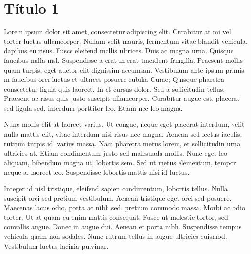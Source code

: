 \chapter{Título 1}
Lorem ipsum dolor sit amet, consectetur adipiscing elit. Curabitur at mi vel tortor luctus ullamcorper. Nullam velit mauris, fermentum vitae blandit vehicula, dapibus eu risus. Fusce eleifend mollis ultrices. Duis ac magna urna. Quisque faucibus nulla nisl. Suspendisse a erat in erat tincidunt fringilla. Praesent mollis quam turpis, eget auctor elit dignissim accumsan. Vestibulum ante ipsum primis in faucibus orci luctus et ultrices posuere cubilia Curae; Quisque pharetra consectetur ligula quis laoreet. In et cursus dolor. Sed a sollicitudin tellus. Praesent ac risus quis justo suscipit ullamcorper. Curabitur augue est, placerat sed ligula sed, interdum porttitor leo. Etiam nec leo magna.

Nunc mollis elit at laoreet varius. Ut congue, neque eget placerat interdum, velit nulla mattis elit, vitae interdum nisi risus nec magna. Aenean sed lectus iaculis, rutrum turpis id, varius massa. Nam pharetra metus lorem, et sollicitudin urna ultricies at. Etiam condimentum justo sed malesuada mollis. Nunc eget leo aliquam, bibendum magna ut, lobortis sem. Sed ut metus elementum, tempor neque a, laoreet leo. Suspendisse lobortis mattis nisi id luctus.

Integer id nisl tristique, eleifend sapien condimentum, lobortis tellus. Nulla suscipit orci sed pretium vestibulum. Aenean tristique eget orci sed posuere. Maecenas lacus odio, porta ac nibh sed, pretium commodo massa. Morbi ac odio tortor. Ut at quam eu enim mattis consequat. Fusce ut molestie tortor, sed convallis augue. Donec in augue dui. Aenean et porta nibh. Suspendisse tempus vehicula quam non sodales. Nunc rutrum tellus in augue ultricies euismod. Vestibulum luctus lacinia pulvinar.